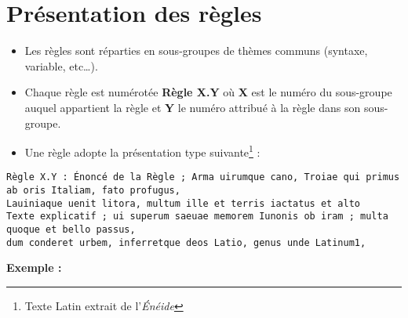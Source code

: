 \section{Présentation des règles}

\begin{itemize}
\item Les règles sont réparties en sous-groupes de thèmes communs (syntaxe, variable, etc…).
\item Chaque règle est numérotée \textbf{Règle X.Y} où \textbf{X} est le numéro du sous-groupe auquel appartient la règle et \textbf{Y} le numéro attribué à la règle dans son sous-groupe.
\item Une règle adopte la présentation type suivante\footnote{Texte Latin extrait de l’\textit{Énéide}} :
\end{itemize}

\begin{verbatim}
Règle X.Y : Énoncé de la Règle ; Arma uirumque cano, Troiae qui primus ab oris Italiam, fato profugus,
Lauiniaque uenit litora, multum ille et terris iactatus et alto
Texte explicatif ; ui superum saeuae memorem Iunonis ob iram ; multa quoque et bello passus,
dum conderet urbem, inferretque deos Latio, genus unde Latinum1,
\end{verbatim}
\begin{large}
\textbf{Exemple :}
\end{large}
\medskip


\bigskip

\pagebreak